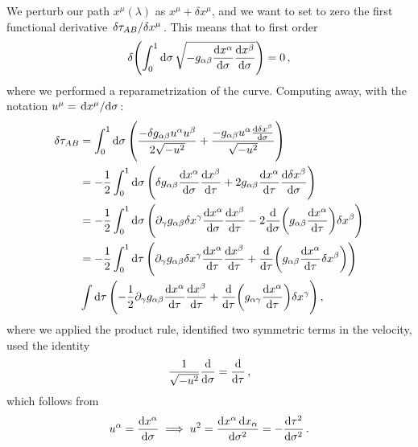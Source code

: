 \documentclass[main.tex]{subfiles}
\begin{document}
We perturb our path \(x^{ \mu }(\lambda )\) as \(x^{\mu } + \delta x^{\mu }\), and we want to set to zero the first functional derivative \(\fdv*{\tau_{AB}}{x^{\mu }}\). This means that to first order 
%
\begin{align}
  \delta \qty(\int _{0}^{1} \dd{\sigma }\sqrt{-g_{\alpha \beta } \dv{x^{\alpha }}{\sigma }\dv{x^{\beta }}{\sigma }} )=0
\,,
\end{align}
%
where we performed a reparametrization of the curve. Computing away, with the notation \(u^{\mu } = \dv*{x^{\mu }}{\sigma }\): 
%
\begin{subequations}
\begin{align}
  \delta \tau_{AB} &= \int_0^{1} \dd{\sigma} \qty(
    \frac{{ -\delta g_{ \alpha \beta } u^{\alpha  } u^{\beta }}}{2 \sqrt{- u^2}} +
      \frac{-g_{\alpha \beta } u^{\alpha } \dv{ \delta x^{\beta }}{\sigma } }{\sqrt{- u^2}}
    )  \\
    &= - \frac{1}{2} \int_0^1  \dd{\sigma } \qty(
        \delta g_{\alpha \beta } \dv{x^{\alpha }}{\sigma }
        \dv{x^{\beta }}{\tau }
        + 2 g_{ \alpha \beta } \dv{x^{\alpha }}{\tau }
        \dv{ \delta x^{\beta }}{\sigma }
    )  \\
    &= - \frac{1}{2} \int_0^1 \dd{\sigma } \qty(
        \partial_{\gamma } g_{\alpha \beta } \delta x^{\gamma } \dv{x^{\alpha }}{\sigma }
        \dv{x^{\beta }}{\tau }
        -2 \dv{}{\sigma } \qty(g_{\alpha \beta } \dv{x^{\alpha }}{\tau }) \delta x^{\beta }
    )  \\
    &= - \frac{1}{2} \int_0^1 \dd{\tau } \qty(
        \partial_{\gamma } g_{\alpha \beta } \delta x^{\gamma } \dv{x^{\alpha }}{\tau } \dv{x^{\beta }}{\tau } +
        \dv{}{\tau } \qty(g_{ \alpha \beta } \dv{x^{\alpha }}{\tau } \delta x^{ \beta } )
    )  \\
    & \int \dd{\tau } \qty(
        -\frac{1}{2} \partial_{\gamma }g_{\alpha \beta } \dv{x^{\alpha }}{\tau } \dv{x^{\beta }}{\tau } + 
        \dv{}{\tau } \qty(g_{\alpha \gamma } \dv{x^{\alpha }}{\tau }) \delta x^{\gamma }
    )
\,,
\end{align}
\end{subequations}
%
where we applied the product rule, identified two symmetric terms in the velocity, used the identity 
%
\begin{align}
  \frac{1}{\sqrt{- u^2}} \dv{}{ \sigma } = \dv{}{\tau }
\,,
\end{align}
% 
which follows from 
%
\begin{align}
u^{\alpha } = \dv{x^{\alpha }}{\sigma }
\implies
u^2 = \frac{ \dd{x^{\alpha }} \dd{x_{\alpha }}}{ \dd{\sigma^2}} = - \frac{ \dd{\tau^2 }}{ \dd{\sigma^2}}
\,.
\end{align}
\end{document}
